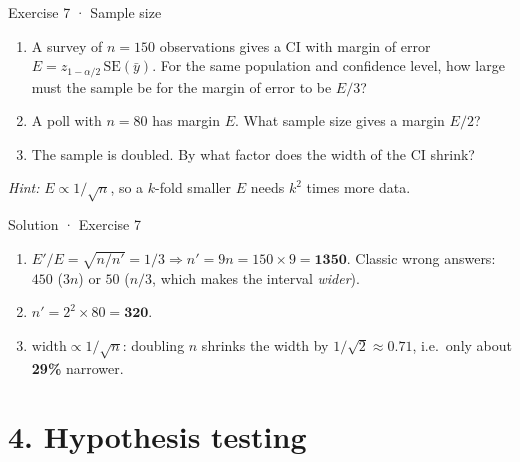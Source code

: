 \documentclass[
  11pt,
  ignorenonframetext,
  aspectratio=169,
]{beamer}
\providecommand{\tightlist}{%
  \setlength{\itemsep}{0pt}\setlength{\parskip}{0pt}}
\newcommand{\se}{\mathrm{SE}}
\begin{document}
\begin{frame}{Exercise 7 · Sample size}
\protect{}\label{exercise-7-sample-size}
\begin{enumerate}
\tightlist
\item
  A survey of \(n=150\) observations gives a CI with margin of error
  \(E=z_{1-\alpha/2}\,\se(\bar y)\). For the same population and
  confidence level, how large must the sample be for the margin of error
  to be \(E/3\)?
\item
  A poll with \(n=80\) has margin \(E\). What sample size gives a margin
  \(E/2\)?
\item
  The sample is doubled. By what factor does the width of the CI shrink?
\end{enumerate}

\emph{Hint:} \(E\propto1/\sqrt n\), so a \(k\)-fold smaller \(E\) needs
\(k^2\) times more data.
\end{frame}

\begin{frame}{Solution · Exercise 7}
\protect{}\label{solution-exercise-7}
\begin{enumerate}
\item
  \(E'/E=\sqrt{n/n'}=1/3\Rightarrow n'=9n=150\times9=\mathbf{1350}\).
  Classic wrong answers: \(450\) (\(3n\)) or \(50\) (\(n/3\), which makes
  the interval \emph{wider}).
\item
  \(n'=2^2\times80=\mathbf{320}\).
\item
  \(\text{width}\propto1/\sqrt n\): doubling \(n\) shrinks the width by
  \(1/\sqrt2\approx0.71\), i.e.~only about \textbf{29\%} narrower.
\end{enumerate}
\end{frame}


\section{4. Hypothesis testing}\label{hypothesis-testing}
\end{document}
